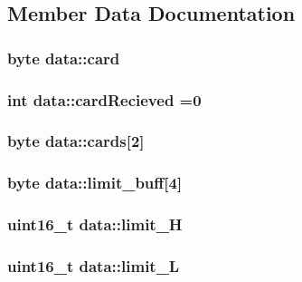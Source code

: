 \subsection{Member Data Documentation}
\hypertarget{structdata_a9edceaacf417a932755881a26f3981b3}{
\subsubsection[{card}]{\setlength{\rightskip}{0pt plus 5cm}byte data\-::card}}\label{structdata_a9edceaacf417a932755881a26f3981b3}
\hypertarget{structdata_a0ecb26db821291cbb69870db48fda7e7}{
\subsubsection[{card\-Recieved}]{\setlength{\rightskip}{0pt plus 5cm}int data\-::card\-Recieved =0}}\label{structdata_a0ecb26db821291cbb69870db48fda7e7}
\hypertarget{structdata_aa95adf1d54211611b8859f396e5461c8}{
\subsubsection[{cards}]{\setlength{\rightskip}{0pt plus 5cm}byte data\-::cards\mbox{[}2\mbox{]}}}\label{structdata_aa95adf1d54211611b8859f396e5461c8}
\hypertarget{structdata_abffea4ce3d58957118e798021b20d21b}{
\subsubsection[{limit\-\_\-buff}]{\setlength{\rightskip}{0pt plus 5cm}byte data\-::limit\-\_\-buff\mbox{[}4\mbox{]}}}\label{structdata_abffea4ce3d58957118e798021b20d21b}
\hypertarget{structdata_ad116e504386d48fc50d7fb1706fba7ed}{
\subsubsection[{limit\-\_\-\-H}]{\setlength{\rightskip}{0pt plus 5cm}uint16\-\_\-t data\-::limit\-\_\-\-H}}\label{structdata_ad116e504386d48fc50d7fb1706fba7ed}
\hypertarget{structdata_a0327d80cf72b681340d6a327722e2ea9}{
\subsubsection[{limit\-\_\-\-L}]{\setlength{\rightskip}{0pt plus 5cm}uint16\-\_\-t data\-::limit\-\_\-\-L}}\label{structdata_a0327d80cf72b681340d6a327722e2ea9}
